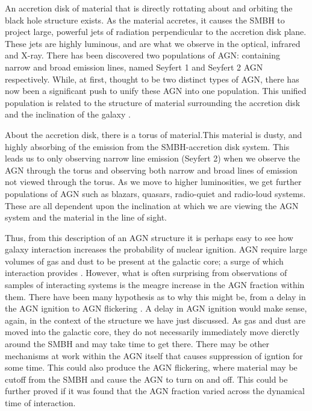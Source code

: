 An accretion disk of material that is directly rottating about and orbiting the black hole structure exists. As the material accretes, it causes the SMBH to project large, powerful jets of radiation perpendicular to the accretion disk plane. These jets are highly luminous, and are what we observe in the optical, infrared and X-ray. There has been discovered two populations of AGN: containing narrow and broad emission lines, named Seyfert 1 and Seyfert 2 AGN respectively. While, at first, thought to be two distinct types of AGN, there has now been a significant push to unify these AGN into one population. This unified population is related to the structure of material surrounding the accretion disk and the inclination of the galaxy \citep[for a review of the unification, see][]{2015ARA&A..53..365N}.

About the accretion disk, there is a torus of material.This material is dusty, and highly absorbing of the emission from the SMBH-accretion disk system. This leads us to only observing narrow line emission (Seyfert 2) when we observe the AGN through the torus and observing both narrow and broad lines of emission not viewed through the torus. As we move to higher luminosities, we get further populations of AGN such as blazars, quasars, radio-quiet and radio-loud systems. These are all dependent upon the inclination at which we are viewing the AGN system and the material in the line of sight.

Thus, from this description of an AGN structure it is perhaps easy to see how galaxy interaction increases the probability of nuclear ignition. AGN require large volumes of gas and dust to be present at the galactic core; a surge of which interaction provides \citep[][provides an excellent summary of this process from the point of view of simulations]{2008ApJS..175..356H}. However, what is often surprising from observations of samples of interacting systems is the meagre increase in the AGN fraction within them. There have been many hypothesis as to why this might be, from a delay in the AGN ignition \citep{2011MNRAS.418.2043E} to AGN flickering \citep{2015MNRAS.451.2517S}. A delay in AGN ignition would make sense, again, in the context of the structure we have just discussed. As gas and dust are moved into the galactic core, they do not necessarily immediately move dierctly around the SMBH and may take time to get there. There may be other mechanisms at work within the AGN itself that causes suppression of igntion for some time. This could also produce the AGN flickering, where material may be cutoff from the SMBH and cause the AGN to turn on and off. This could be further proved if it was found that the AGN fraction varied across the dynamical time of interaction.

